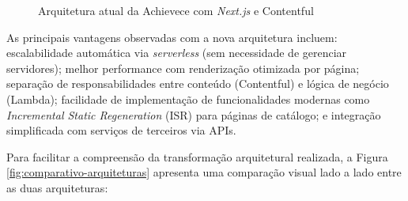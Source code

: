 \begin{figure}[htb]
\caption{Arquitetura atual da Achievece com \textit{Next.js} e Contentful}
\label{fig:arquitetura-nova}
\end{figure}

As principais vantagens observadas com a nova arquitetura incluem: escalabilidade automática via \textit{serverless} (sem necessidade de gerenciar servidores); melhor performance com renderização otimizada por página; separação de responsabilidades entre conteúdo (Contentful) e lógica de negócio (Lambda); facilidade de implementação de funcionalidades modernas como \textit{Incremental Static Regeneration} (ISR) para páginas de catálogo; e integração simplificada com serviços de terceiros via APIs.

Para facilitar a compreensão da transformação arquitetural realizada, a Figura \ref{fig:comparativo-arquiteturas} apresenta uma comparação visual lado a lado entre as duas arquiteturas:

